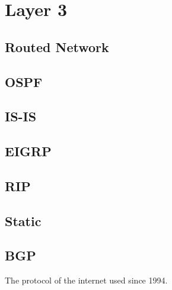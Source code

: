 \chapter{Layer 3}

\section{Routed Network}

\section{OSPF}
\section{IS-IS}
\section{EIGRP}
\section{RIP}
\section{Static}
\section{BGP}


The protocol of the internet used since 1994.\cite{wiki:Border_Gateway_Protocol}

